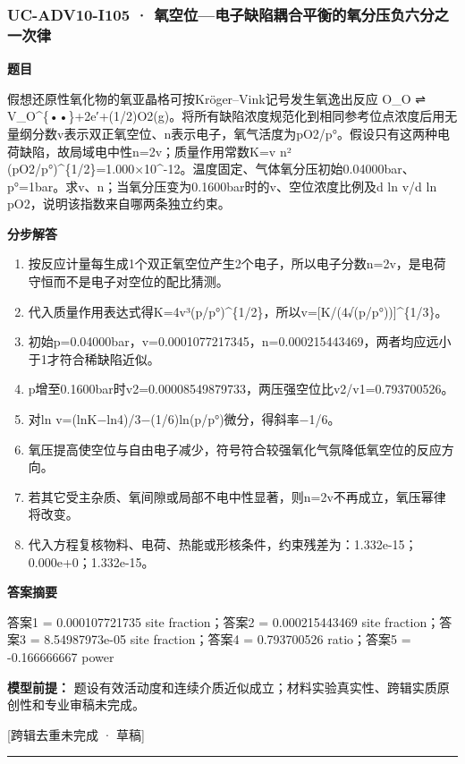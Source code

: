 \documentclass[UTF8,11pt,a4paper]{ctexart}
\begin{document}
\subsubsection*{UC-ADV10-I105 · 氧空位—电子缺陷耦合平衡的氧分压负六分之一次律}
\noindent\textbf{题目}\par
假想还原性氧化物的氧亚晶格可按Kröger–Vink记号发生氧逸出反应 O\_O ⇌ V\_O\textasciicircum{}\{••\}+2e′+(1/2)O2(g)。将所有缺陷浓度规范化到相同参考位点浓度后用无量纲分数v表示双正氧空位、n表示电子，氧气活度为pO2/p°。假设只有这两种电荷缺陷，故局域电中性n=2v；质量作用常数K=v n² (pO2/p°)\textasciicircum{}\{1/2\}=1.000×10\textasciicircum{}-12。温度固定、气体氧分压初始0.04000bar、p°=1bar。求v、n；当氧分压变为0.1600bar时的v、空位浓度比例及d ln v/d ln pO2，说明该指数来自哪两条独立约束。\par
\medskip\noindent\textbf{分步解答}
\begin{enumerate}
\item 按反应计量每生成1个双正氧空位产生2个电子，所以电子分数n=2v，是电荷守恒而不是电子对空位的配比猜测。
\item 代入质量作用表达式得K=4v³(p/p°)\textasciicircum{}\{1/2\}，所以v=[K/(4√(p/p°))]\textasciicircum{}\{1/3\}。
\item 初始p=0.04000bar，v=0.0001077217345，n=0.000215443469，两者均应远小于1才符合稀缺陷近似。
\item p增至0.1600bar时v2=0.00008549879733，两压强空位比v2/v1=0.793700526。
\item 对ln v=(lnK−ln4)/3−(1/6)ln(p/p°)微分，得斜率−1/6。
\item 氧压提高使空位与自由电子减少，符号符合较强氧化气氛降低氧空位的反应方向。
\item 若其它受主杂质、氧间隙或局部不电中性显著，则n=2v不再成立，氧压幂律将改变。
\item 代入方程复核物料、电荷、热能或形核条件，约束残差为：1.332e-15；0.000e+0；1.332e-15。
\end{enumerate}
\noindent\textbf{答案摘要}\par
答案1 = 0.000107721735 site fraction；答案2 = 0.000215443469 site fraction；答案3 = 8.54987973e-05 site fraction；答案4 = 0.793700526 ratio；答案5 = -0.166666667 power\par
\noindent\textbf{模型前提：}
题设有效活动度和连续介质近似成立；材料实验真实性、跨辑实质原创性和专业审稿未完成。\par
\noindent\textcolor{red!65!black}{[跨辑去重未完成 · 草稿]} \par
\medskip\hrule\medskip
{}
\end{document}
